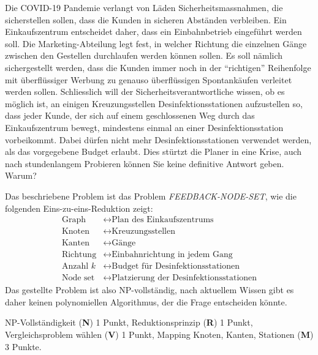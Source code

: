 Die COVID-19 Pandemie verlangt von Läden Sicherheitsmassnahmen, die
sicherstellen sollen, dass die Kunden in sicheren Abständen verbleiben.
Ein Einkaufszentrum entscheidet daher, dass ein Einbahnbetrieb eingeführt werden soll.
Die Marketing-Abteilung legt fest, in welcher Richtung die einzelnen
Gänge zwischen den Gestellen durchlaufen werden können sollen.
Es soll nämlich sichergestellt werden, dass die Kunden immer noch 
in der ``richtigen'' Reihenfolge mit überflüssiger Werbung zu
genauso überflüssigen Spontankäufen verleitet werden sollen.
Schliesslich will der Sicherheitsverantwortliche wissen, ob es möglich
ist, an einigen
Kreuzungsstellen Desinfektionsstationen aufzustellen so,
dass jeder Kunde, der sich auf einem geschlossenen Weg durch das
Einkaufszentrum bewegt, mindestens einmal an einer Desinfektionsstation
vorbeikommt.
Dabei dürfen nicht mehr Desinfektionsstationen verwendet werden, als
das vorgegebene Budget erlaubt.
Dies stürtzt die Planer in eine Krise, auch nach stundenlangem
Probieren können Sie keine definitive Antwort geben.
Warum?

\begin{loesung}
Das beschriebene Problem ist das Problem \textsl{FEEDBACK-NODE-SET},
wie die folgenden Eins-zu-eins-Reduktion zeigt:
\begin{align*}
\text{Graph} &\leftrightarrow \text{Plan des Einkaufszentrums}
\\
\text{Knoten}&\leftrightarrow \text{Kreuzungsstellen}
\\
\text{Kanten}&\leftrightarrow \text{Gänge}
\\
\text{Richtung}&\leftrightarrow \text{Einbahnrichtung in jedem Gang}
\\
\text{Anzahl $k$}&\leftrightarrow \text{Budget für Desinfektionsstationen}
\\
\text{Node set}&\leftrightarrow \text{Platzierung der Desinfektionsstationen}
\end{align*}
Das gestellte Problem ist also NP-vollständig, nach aktuellem Wissen gibt
es daher keinen polynomiellen Algorithmus, der die Frage entscheiden könnte.
\end{loesung}

\begin{bewertung}
NP-Vollständigkeit ({\bf N}) 1 Punkt,
Reduktionsprinzip ({\bf R}) 1 Punkt,
Vergleichsproblem wählen ({\bf V}) 1 Punkt,
Mapping Knoten, Kanten, Stationen ({\bf M}) 3 Punkte.
\end{bewertung}
